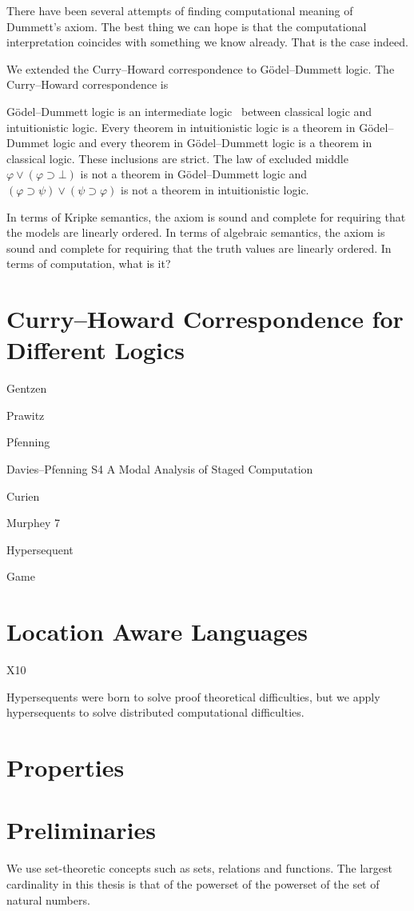 There have been several attempts of finding computational meaning of
Dummett's axiom.  
The best thing we can hope is that the computational
interpretation coincides with something we know already.
That is the case indeed.

We extended the Curry--Howard correspondence to G\"odel--Dummett logic.
The Curry--Howard correspondence is 

G\"odel--Dummett logic is an intermediate logic~\citep{umezawa} between
classical logic and intuitionistic logic.  Every theorem in
intuitionistic logic is a theorem in G\"odel--Dummet logic and every
theorem in G\"odel--Dummett logic is a theorem in classical logic.
These inclusions are strict.  The law of excluded middle
$\varphi\vee(\varphi\supset \bot)$ is not a theorem in G\"odel--Dummett
logic and $(\varphi\supset\psi)\vee(\psi\supset\varphi)$ is not a
theorem in intuitionistic logic.

In terms of Kripke semantics, the axiom is sound and complete for
requiring that the models are linearly ordered.
In terms of algebraic semantics, the axiom is sound and complete for
requiring that the truth values are linearly ordered.  
In terms of computation, what is it?

\section{Curry--Howard Correspondence for Different Logics}

Gentzen

Prawitz

Pfenning

Davies--Pfenning S4 A Modal Analysis of Staged Computation

Curien

Murphey 7

Hypersequent

Game

\section{Location Aware Languages}

X10


Hypersequents were born to solve proof theoretical difficulties, but we
apply hypersequents to solve distributed computational difficulties.

\section{Properties}


\section{Preliminaries}

We use set-theoretic concepts such as sets, relations and functions.
The largest cardinality in this thesis is that of the
powerset of the powerset of the set of natural numbers.